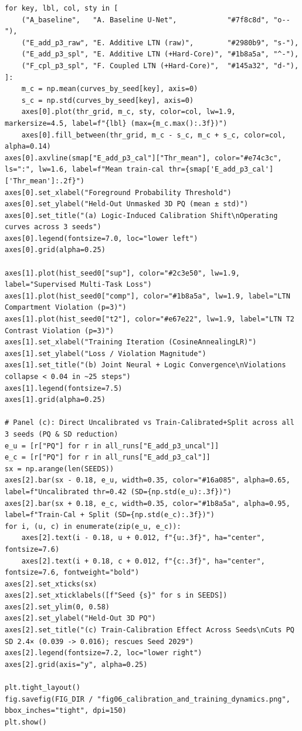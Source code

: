\documentclass[10pt,a4paper]{article}
\renewcommand{\_}{\origunderscore\allowbreak}
\begin{document}
\begin{codebox}
\begin{lstlisting}[style=pybmed]
for key, lbl, col, sty in [
    ("A_baseline",   "A. Baseline U-Net",            "#7f8c8d", "o--"),
    ("E_add_p3_raw", "E. Additive LTN (raw)",        "#2980b9", "s-"),
    ("E_add_p3_spl", "E. Additive LTN (+Hard-Core)", "#1b8a5a", "^-"),
    ("F_cpl_p3_spl", "F. Coupled LTN (+Hard-Core)",  "#145a32", "d-"),
]:
    m_c = np.mean(curves_by_seed[key], axis=0)
    s_c = np.std(curves_by_seed[key], axis=0)
    axes[0].plot(thr_grid, m_c, sty, color=col, lw=1.9, markersize=4.5, label=f"{lbl} (max={m_c.max():.3f})")
    axes[0].fill_between(thr_grid, m_c - s_c, m_c + s_c, color=col, alpha=0.14)
axes[0].axvline(smap["E_add_p3_cal"]["Thr_mean"], color="#e74c3c", ls=":", lw=1.6, label=f"Mean train-cal thr={smap['E_add_p3_cal']['Thr_mean']:.2f}")
axes[0].set_xlabel("Foreground Probability Threshold")
axes[0].set_ylabel("Held-Out Unmasked 3D PQ (mean ± std)")
axes[0].set_title("(a) Logic-Induced Calibration Shift\nOperating curves across 3 seeds")
axes[0].legend(fontsize=7.0, loc="lower left")
axes[0].grid(alpha=0.25)

axes[1].plot(hist_seed0["sup"], color="#2c3e50", lw=1.9, label="Supervised Multi-Task Loss")
axes[1].plot(hist_seed0["comp"], color="#1b8a5a", lw=1.9, label="LTN Compartment Violation (p=3)")
axes[1].plot(hist_seed0["t2"], color="#e67e22", lw=1.9, label="LTN T2 Contrast Violation (p=3)")
axes[1].set_xlabel("Training Iteration (CosineAnnealingLR)")
axes[1].set_ylabel("Loss / Violation Magnitude")
axes[1].set_title("(b) Joint Neural + Logic Convergence\nViolations collapse < 0.04 in ~25 steps")
axes[1].legend(fontsize=7.5)
axes[1].grid(alpha=0.25)

# Panel (c): Direct Uncalibrated vs Train-Calibrated+Split across all 3 seeds (PQ & SD reduction)
e_u = [r["PQ"] for r in all_runs["E_add_p3_uncal"]]
e_c = [r["PQ"] for r in all_runs["E_add_p3_cal"]]
sx = np.arange(len(SEEDS))
axes[2].bar(sx - 0.18, e_u, width=0.35, color="#16a085", alpha=0.65, label=f"Uncalibrated thr=0.42 (SD={np.std(e_u):.3f})")
axes[2].bar(sx + 0.18, e_c, width=0.35, color="#1b8a5a", alpha=0.95, label=f"Train-Cal + Split (SD={np.std(e_c):.3f})")
for i, (u, c) in enumerate(zip(e_u, e_c)):
    axes[2].text(i - 0.18, u + 0.012, f"{u:.3f}", ha="center", fontsize=7.6)
    axes[2].text(i + 0.18, c + 0.012, f"{c:.3f}", ha="center", fontsize=7.6, fontweight="bold")
axes[2].set_xticks(sx)
axes[2].set_xticklabels([f"Seed {s}" for s in SEEDS])
axes[2].set_ylim(0, 0.58)
axes[2].set_ylabel("Held-Out 3D PQ")
axes[2].set_title("(c) Train-Calibration Effect Across Seeds\nCuts PQ SD 2.4× (0.039 -> 0.016); rescues Seed 2029")
axes[2].legend(fontsize=7.2, loc="lower right")
axes[2].grid(axis="y", alpha=0.25)

plt.tight_layout()
fig.savefig(FIG_DIR / "fig06_calibration_and_training_dynamics.png", bbox_inches="tight", dpi=150)
plt.show()
\end{lstlisting}
\end{codebox}
\end{document}
